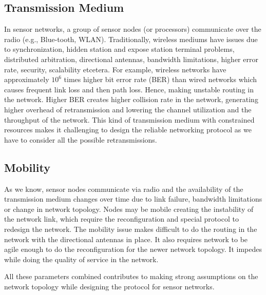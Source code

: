 	\subsection{Transmission Medium}
		In sensor networks, a group of sensor nodes (or processors) communicate over the radio (e.g., Blue-tooth, WLAN).
		Traditionally, wireless mediums have issues due to synchronization, hidden station and expose station terminal problems, distributed arbitration, directional antennas, bandwidth limitations, higher error rate, security, scalability etcetera.
		For example, wireless networks have approximately $10^6$ times higher bit error rate (BER) than wired networks which causes frequent link loss and then path loss. 
		Hence, making unstable routing in the network.
		Higher BER creates higher collision rate in the network, generating higher overhead of retransmission and lowering the channel utilization and the throughput of the network.
		This kind of transmission medium with constrained resources makes it challenging to design the reliable networking protocol as we have to consider all the possible retransmissions.

	\subsection{Mobility}
		As we know, sensor nodes communicate via radio and the availability of the transmission medium changes over time due to link failure, bandwidth limitations or change in network topology.
		Nodes may be mobile creating the instability of the network link, which require the reconfiguration and special protocol to redesign the network.
		The mobility issue makes difficult to do the routing in the network with the directional antennas in place.
		It also requires network to be agile enough to do the reconfiguration for the newer network topology.
		It impedes while doing the quality of service in the network. 
		
	All these parameters combined contributes to making strong assumptions on the network topology while designing the protocol for sensor networks.